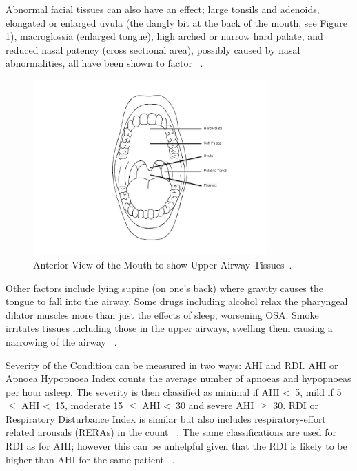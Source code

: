 Abnormal facial tissues can also have an effect; large tonsils and adenoids, elongated or enlarged uvula (the dangly bit at the back of the mouth, see Figure \ref{fig:Anterior-View-Mouth}), macroglossia (enlarged tongue), high arched or narrow hard palate, and reduced nasal patency (cross sectional area), possibly caused by nasal abnormalities, all have been shown to factor ~\cite{schwab1995upper}.

\begin{figure}[h]
\centering
\includegraphics[width=0.8\textwidth]{drawings/Anterior-View-Mouth}
\caption{Anterior View of the Mouth to show Upper Airway Tissues~\cite{anteriormouth}.}
\label{fig:Anterior-View-Mouth}
\end{figure}

Other factors include lying supine (on one’s back) where gravity causes the tongue to fall into the airway. Some drugs including alcohol relax the pharyngeal dilator muscles more than just the effects of sleep, worsening OSA. Smoke irritates tissues including those in the upper airways, swelling them causing a narrowing of the airway ~\cite{apneosotherfactors}.

 Severity of the Condition can be measured in two ways: AHI and RDI. AHI or Apnoea Hypopnoea Index counts the average number of apnoeas and hypopnoeas per hour asleep. The severity is then classified as minimal if AHI \textless\ 5, mild if 5 $\leq$ AHI \textless\ 15, moderate 15 $\leq$ AHI \textless\ 30 and severe AHI $\geq$ 30. RDI or Respiratory Disturbance Index is similar but also includes respiratory-effort related arousals (RERAs) in the count ~\cite{AHI}. The same classifications are used for RDI as for AHI; however this can be unhelpful given that the RDI is likely to be higher than AHI for the same patient ~\cite{epstein2009clinical}.

